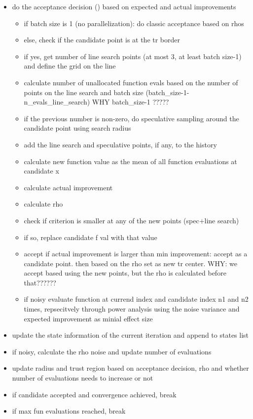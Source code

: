 \begin{itemize}
   \item do the acceptance decision () based on expected and actual improvements
        \begin{itemize}
            \item if batch size is 1 (no parallelization): do classic acceptance based on rhos
            \item else, check if the candidate point is at the tr border
            \item if yes, get number of line search points (at most 3, at least batch size-1) and define the grid on the line
            \item calculate number of unallocated function evals based on the number of points on the line search and batch size (batch_size-1-n_evals_line_search) WHY batch_size-1 ?????
            \item if the previous number is non-zero, do speculative sampling around the candidate point using search radius
            \item add the line search and speculative points, if any, to the history
            \item calculate new function value as the mean of all function evaluations at candidate x
            \item calculate actual improvement
            \item calculate rho
            \item check if criterion is smaller at any of the new points (spec+line search)
            \item if so, replace candidate f val with that value
            \item accept if actual improvement is larger than min improvement: accept as a candidate point. then based on the rho set as new tr center. WHY: we accept based using the new points, but the rho is calculated before that??????
            \item if noisy evaluate function at currend index and candidate index n1 and n2 times, repsecitvely through power analysis using the noise variance and expected improvement as minial effect size
        \end{itemize}
   \item update the state information of the current iteration and append to states list
   \item if noisy, calculate the rho noise and update number of evaluations
   \item update radius and trust region based on acceptance decision, rho and whether number of evaluations needs to increase or not
   \item if candidate accepted and convergence achieved, break
   \item if max fun evaluations reached, break
\end{itemize}
